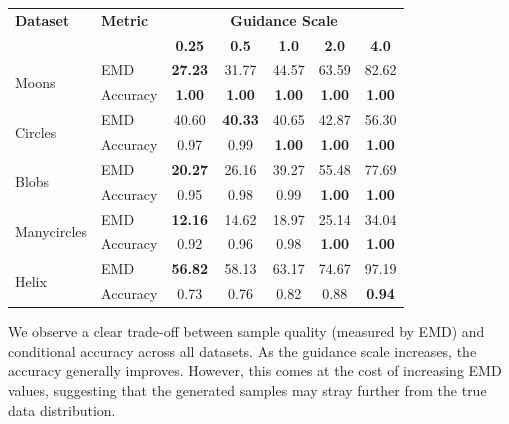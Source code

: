 \documentclass[11pt]{article}
\begin{document}
\begin{longtable}{|l|l|c|c|c|c|c|}
    \hline
    \textbf{Dataset} & \textbf{Metric} & \multicolumn{5}{c|}{\textbf{Guidance Scale}} \\
    \cline{3-7}
    & & \textbf{0.25} & \textbf{0.5} & \textbf{1.0} & \textbf{2.0} & \textbf{4.0} \\
    \hline
    \multirow{2}{*}{Moons} & EMD & \textbf{27.23} & 31.77 & 44.57 & 63.59 & 82.62 \\
    \cline{2-7}
    & Accuracy & \textbf{1.00} & \textbf{1.00} & \textbf{1.00} & \textbf{1.00} & \textbf{1.00} \\
    \hline
    \multirow{2}{*}{Circles} & EMD & 40.60 & \textbf{40.33} & 40.65 & 42.87 & 56.30 \\
    \cline{2-7}
    & Accuracy & 0.97 & 0.99 & \textbf{1.00} & \textbf{1.00} & \textbf{1.00} \\
    \hline
    \multirow{2}{*}{Blobs} & EMD & \textbf{20.27} & 26.16 & 39.27 & 55.48 & 77.69 \\
    \cline{2-7}
    & Accuracy & 0.95 & 0.98 & 0.99 & \textbf{1.00} & \textbf{1.00} \\
    \hline
    \multirow{2}{*}{Manycircles} & EMD & \textbf{12.16} & 14.62 & 18.97 & 25.14 & 34.04 \\
    \cline{2-7}
    & Accuracy & 0.92 & 0.96 & 0.98 & \textbf{1.00} & \textbf{1.00} \\
    \hline
    \multirow{2}{*}{Helix} & EMD & \textbf{56.82} & 58.13 & 63.17 & 74.67 & 97.19 \\
    \cline{2-7}
    & Accuracy & 0.73 & 0.76 & 0.82 & 0.88 & \textbf{0.94} \\
    \hline
\end{longtable}
\label{tab:cfg_results}

We observe a clear trade-off between sample quality (measured by EMD) and conditional accuracy across all datasets. As the guidance scale increases, the accuracy generally improves. However, this comes at the cost of increasing EMD values, suggesting that the generated samples may stray further from the true data distribution.
\end{document}
